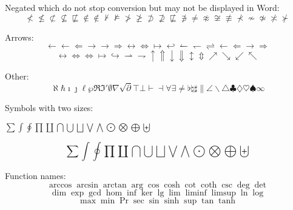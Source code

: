 Negated which do not stop conversion but may not be displayed in Word:
\begin{dmath}[compact,spread={1.250000\baselineskip}] \not< \not\leq \not\subset \not\subseteq \not\sqsubseteq \not\in \notin \not\vdash \not\models \not> \not\geq \not\supset \not\supseteq \not\sqsubseteq \not\ni \not= \not\approx \not\cong \not\equiv \not\prec \not\sim \not\simeq \not\asymp \not\succ  \end{dmath}


Arrows:
\begin{dmath}[compact,spread={1.250000\baselineskip}] \leftarrow \gets \Leftarrow \rightarrow \to \Rightarrow \leftrightarrow \Leftrightarrow \mapsto \hookleftarrow \leftharpoonup \leftharpoondown \rightleftharpoons \longleftarrow \Longleftarrow \longrightarrow \Longrightarrow  \end{dmath}
\begin{dmath}[compact,spread={1.250000\baselineskip}] \longleftrightarrow \Longleftrightarrow \iff \longmapsto \hookrightarrow \rightharpoonup \rightharpoondown \uparrow \Uparrow \downarrow \Downarrow \updownarrow \Updownarrow \nearrow \searrow \swarrow \nwarrow \end{dmath}

Other:
\begin{dmath}[compact,spread={1.250000\baselineskip}] \aleph \hbar \imath \jmath \ell \wp \Re \Im \prime \emptyset \nabla \surd \partial \top \bot \vdash \dashv \forall \exists \neq \flat \natural \sharp \| \angle \backslash \triangle \clubsuit \diamondsuit \heartsuit \spadesuit \infty \end{dmath}

Symbols with two sizes: 
\begin{center}
\(\sum \int \oint \prod \coprod \bigcap \bigcup \bigsqcup \bigvee \bigwedge \bigodot \bigotimes \bigoplus \biguplus\)
\end{center}
\begin{dmath}[compact,spread={1.250000\baselineskip}] \sum \int \oint \prod \coprod \bigcap \bigcup \bigsqcup \bigvee \bigwedge \bigodot \bigotimes \bigoplus \biguplus \end{dmath}

Function names:
\begin{dmath}[compact,spread={1.250000\baselineskip}] \arccos \arcsin \arctan \arg \cos \cosh \cot \coth \csc \deg \det  \end{dmath}
\begin{dmath}[compact,spread={1.250000\baselineskip}] \dim \exp \gcd \hom \inf \ker \lg \lim \liminf \limsup \ln \log  \end{dmath}
\begin{dmath}[compact,spread={1.250000\baselineskip}] \max \min \Pr \sec \sin \sinh \sup \tan \tanh \end{dmath}

